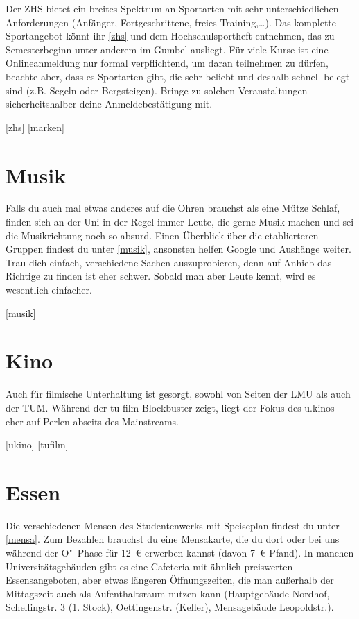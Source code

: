 Der ZHS bietet ein breites Spektrum an Sportarten mit sehr unterschiedlichen
Anforderungen (Anfänger, Fortgeschrittene, freies Training,\ldots). Das
komplette Sportangebot könnt ihr \ref{zhs} und dem Hochschulsportheft
entnehmen, das zu Semesterbeginn unter anderem im Gumbel ausliegt. Für viele
Kurse ist eine Onlineanmeldung nur formal verpflichtend, um daran teilnehmen zu
dürfen, beachte aber, dass es Sportarten gibt, die sehr beliebt und deshalb
schnell belegt sind (z.B. Segeln oder Bergsteigen). Bringe zu solchen
Veranstaltungen sicherheitshalber deine Anmeldebestätigung mit.

\begin{urlList}
	[zhs]
	[marken]
\end{urlList}

\section{Musik}
Falls du auch mal etwas anderes auf die Ohren brauchst als eine
Mütze Schlaf, finden sich an der Uni in der Regel immer Leute, die gerne Musik
machen und sei die Musikrichtung noch so absurd. Einen Überblick über die
etablierteren Gruppen findest du unter \ref{musik}, ansonsten helfen Google und
Aushänge weiter. Trau dich einfach, verschiedene Sachen auszuprobieren, denn
auf Anhieb das Richtige zu finden ist eher schwer. Sobald man aber Leute kennt,
wird es wesentlich einfacher.

\begin{urlList}
	[musik]
\end{urlList}

\section{Kino}
Auch für filmische Unterhaltung ist gesorgt, sowohl von Seiten der LMU als auch
der TUM. Während der tu film Blockbuster zeigt, liegt der Fokus des u.kinos
eher auf Perlen abseits des Mainstreams.

\begin{urlList}
	[ukino]
	[tufilm]
\end{urlList}

\section{Essen}
Die verschiedenen Mensen des Studentenwerks mit Speiseplan findest du unter \ref{mensa}. 
Zum Bezahlen brauchst du eine Mensakarte, die du dort oder bei uns während der O"~Phase für 12~€ erwerben kannst (davon 7~€ Pfand). In manchen Universitätsgebäuden gibt es eine Cafeteria mit ähnlich preiswerten Essensangeboten, aber etwas längeren Öffnungszeiten, die man außerhalb der Mittagszeit auch als Aufenthaltsraum nutzen kann (Hauptgebäude Nordhof, Schellingstr. 3 (1. Stock), Oettingenstr. (Keller), Mensagebäude Leopoldstr.).

